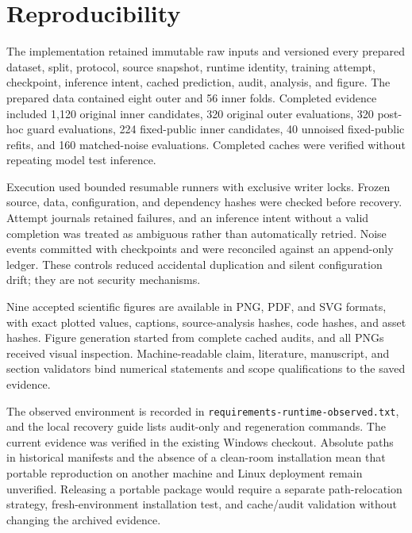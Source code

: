\documentclass[journal]{IEEEtran}
\begin{document}
\section{Reproducibility}

The implementation retained immutable raw inputs and versioned every prepared
dataset, split, protocol, source snapshot, runtime identity, training attempt,
checkpoint, inference intent, cached prediction, audit, analysis, and figure.
The prepared data contained eight outer and 56 inner folds. Completed evidence
included 1,120 original inner candidates, 320 original outer evaluations, 320
post-hoc guard evaluations, 224 fixed-public inner candidates, 40 unnoised
fixed-public refits, and 160 matched-noise evaluations. Completed caches were
verified without repeating model test inference.

Execution used bounded resumable runners with exclusive writer locks. Frozen
source, data, configuration, and dependency hashes were checked before recovery.
Attempt journals retained failures, and an inference intent without a valid
completion was treated as ambiguous rather than automatically retried. Noise
events committed with checkpoints and were reconciled against an append-only
ledger. These controls reduced accidental duplication and silent configuration
drift; they are not security mechanisms.

Nine accepted scientific figures are available in PNG, PDF, and SVG formats,
with exact plotted values, captions, source-analysis hashes, code hashes, and
asset hashes. Figure generation started from complete cached audits, and all
PNGs received visual inspection. Machine-readable claim, literature, manuscript,
and section validators bind numerical statements and scope qualifications to the
saved evidence.

The observed environment is recorded in \texttt{requirements-runtime-observed.txt},
and the local recovery guide lists audit-only and regeneration commands. The
current evidence was verified in the existing Windows checkout. Absolute paths
in historical manifests and the absence of a clean-room installation mean that
portable reproduction on another machine and Linux deployment remain unverified.
Releasing a portable package would require a separate path-relocation strategy,
fresh-environment installation test, and cache/audit validation without changing
the archived evidence.

\end{document}
